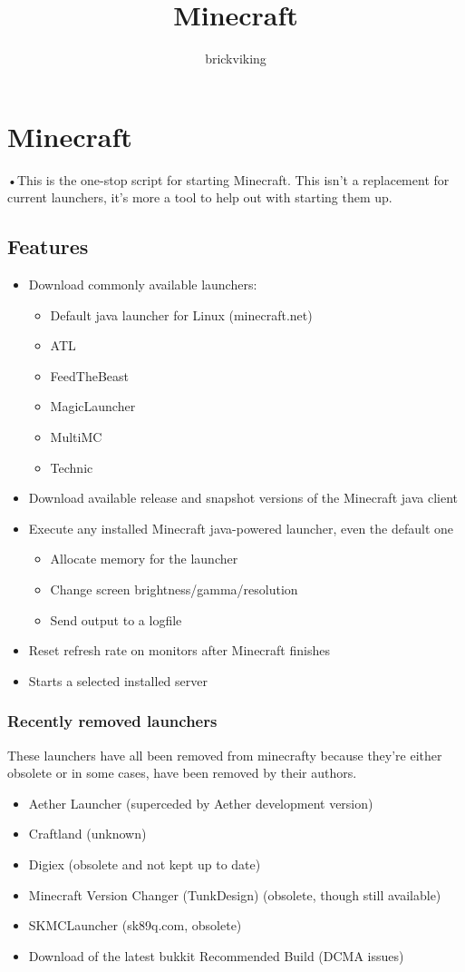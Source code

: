 \documentclass[10pt,a4paper]{book}
\author{brickviking}
\title{Minecraft}
\begin{document}
\chapter*{Minecraft}

•This is the one-stop script for starting Minecraft. This isn't a replacement for current
launchers, it's more a tool to help out with starting them up.

\section*{Features}
\begin{itemize}
\item Download commonly available launchers:
{\begin{itemize}
  \item Default java launcher for Linux (minecraft.net)
  \item ATL
  \item FeedTheBeast
  \item MagicLauncher
  \item MultiMC
  \item Technic
\end{itemize}}
\item Download available release and snapshot versions of the Minecraft java client
\item Execute any installed Minecraft java-powered launcher, even the default one
{\begin{itemize}
  \item Allocate memory for the launcher
  \item Change screen brightness/gamma/resolution
  \item Send output to a logfile 
\end{itemize}}
\item Reset refresh rate on monitors after Minecraft finishes
\item Starts a selected installed server
\end{itemize}

\subsection*{Recently removed launchers}
These launchers have all been removed from minecrafty because they're either
obsolete or in some cases, have been removed by their authors.
\begin{itemize}
  \item Aether Launcher (superceded by Aether development version)
  \item Craftland (unknown)
  \item Digiex (obsolete and not kept up to date)
  \item Minecraft Version Changer (TunkDesign) (obsolete, though still available)
  \item SKMCLauncher (sk89q.com, obsolete)
  \item Download of the latest bukkit Recommended Build (DCMA issues)
\end{itemize}
\end{document}
